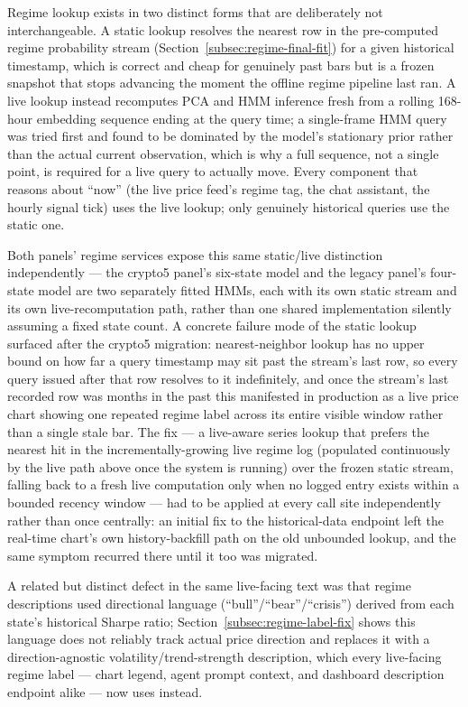 Regime lookup exists in two distinct forms that are deliberately not interchangeable. A static lookup resolves the nearest row in the pre-computed regime probability stream (Section~\ref{subsec:regime-final-fit}) for a given historical timestamp, which is correct and cheap for genuinely past bars but is a frozen snapshot that stops advancing the moment the offline regime pipeline last ran. A live lookup instead recomputes PCA and HMM inference fresh from a rolling 168-hour embedding sequence ending at the query time; a single-frame HMM query was tried first and found to be dominated by the model's stationary prior rather than the actual current observation, which is why a full sequence, not a single point, is required for a live query to actually move. Every component that reasons about ``now'' (the live price feed's regime tag, the chat assistant, the hourly signal tick) uses the live lookup; only genuinely historical queries use the static one.

Both panels' regime services expose this same static/live distinction independently --- the crypto5 panel's six-state model and the legacy panel's four-state model are two separately fitted HMMs, each with its own static stream and its own live-recomputation path, rather than one shared implementation silently assuming a fixed state count. A concrete failure mode of the static lookup surfaced after the crypto5 migration: nearest-neighbor lookup has no upper bound on how far a query timestamp may sit past the stream's last row, so every query issued after that row resolves to it indefinitely, and once the stream's last recorded row was months in the past this manifested in production as a live price chart showing one repeated regime label across its entire visible window rather than a single stale bar. The fix --- a live-aware series lookup that prefers the nearest hit in the incrementally-growing live regime log (populated continuously by the live path above once the system is running) over the frozen static stream, falling back to a fresh live computation only when no logged entry exists within a bounded recency window --- had to be applied at every call site independently rather than once centrally: an initial fix to the historical-data endpoint left the real-time chart's own history-backfill path on the old unbounded lookup, and the same symptom recurred there until it too was migrated.

A related but distinct defect in the same live-facing text was that regime descriptions used directional language (``bull''/``bear''/``crisis'') derived from each state's historical Sharpe ratio; Section~\ref{subsec:regime-label-fix} shows this language does not reliably track actual price direction and replaces it with a direction-agnostic volatility/trend-strength description, which every live-facing regime label --- chart legend, agent prompt context, and dashboard description endpoint alike --- now uses instead.

